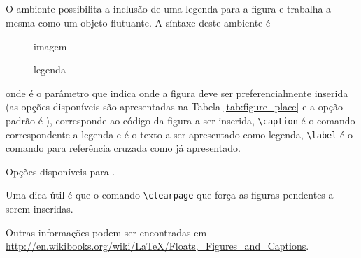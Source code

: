 \subsection{}
O ambiente  possibilita
a inclusão de uma legenda para a figura e trabalha a mesma como um objeto
flutuante. A síntaxe deste ambiente é
\begin{code}
  \begin{figure}[place]
    imagem
    \caption{legenda}
    \label{P:imagem}
  \end{figure}
\end{code}
onde  é o parâmetro que indica onde a figura deve ser
preferencialmente inserida (as opções disponíveis são apresentadas na Tabela
\ref{tab:figure_place} e a opção padrão é ), 
corresponde ao código da figura a ser inserida,
\lstinline!\caption! é o comando
correspondente a legenda e  é o texto a ser apresentado como
legenda, \lstinline!\label! é o comando para referência cruzada como já
apresentado. \\
\begin{table}[!htb]
  \centering
  \caption{Opções disponíveis para .}
  \label{tab:figure_place}
  
\end{table}

Uma dica útil é que o comando
\lstinline!\clearpage! que força
as figuras pendentes a serem inseridas.

Outras informações podem ser encontradas em
\url{http://en.wikibooks.org/wiki/LaTeX/Floats,_Figures_and_Captions}.
